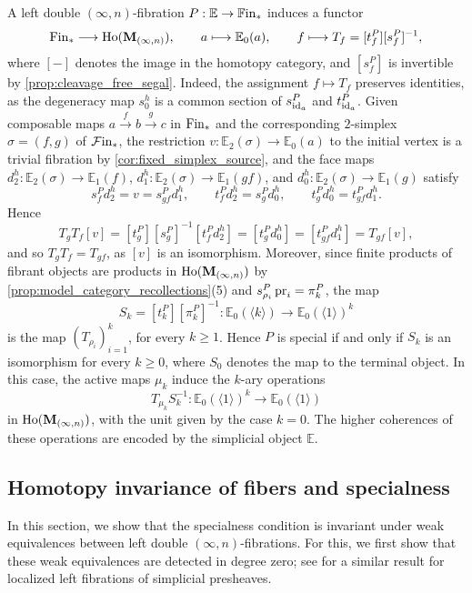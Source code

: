 \documentclass[10pt,reqno]{amsart}
\begin{document}
\begin{rmk}
\label{rem:internal_transport_operations}
A left double $(\infty,n)$-fibration $P:\mathbb E\to\mathbb{F}\mathrm{in}_*$
induces a functor
\[
\mathrm{Fin}_*\longrightarrow\operatorname{Ho}(\mathbf M_{(\infty,n)}),
\qquad
a\longmapsto\mathbb E_0(a),
\qquad
f\longmapsto T_f=[t_f^P][s_f^P]^{-1},
\]
where $[-]$ denotes the image in the homotopy category, and
$[s_f^P]$ is invertible by \cref{prop:cleavage_free_segal}. Indeed,
the assignment $f\mapsto T_f$ preserves identities, as the
degeneracy map $s_0^h$ is a common section of $s_{\operatorname{id}_a}^P$ and
$t_{\operatorname{id}_a}^P$. Given composable maps
$a\xrightarrow{f}b\xrightarrow{g}c$ in $\mathrm{Fin}_*$ and the corresponding
$2$-simplex $\sigma=(f,g)$ of $\mathcal{F}\mathrm{in}_*$, the restriction
$v:\mathbb E_2(\sigma)\to\mathbb E_0(a)$ to the initial vertex is a
trivial fibration by \cref{cor:fixed_simplex_source}, and the face
maps $d_2^h:\mathbb E_2(\sigma)\to\mathbb E_1(f)$,
$d_1^h:\mathbb E_2(\sigma)\to\mathbb E_1(gf)$, and
$d_0^h:\mathbb E_2(\sigma)\to\mathbb E_1(g)$ satisfy
\[
s_f^Pd_2^h=v=s_{gf}^Pd_1^h,
\qquad
t_f^Pd_2^h=s_g^Pd_0^h,
\qquad
t_g^Pd_0^h=t_{gf}^Pd_1^h.
\]
Hence
\[
T_gT_f[v]
=[t_g^P][s_g^P]^{-1}[t_f^Pd_2^h]
=[t_g^Pd_0^h]
=[t_{gf}^Pd_1^h]
=T_{gf}[v],
\]
and so $T_gT_f=T_{gf}$, as $[v]$ is an isomorphism. Moreover,
since finite products of fibrant objects are products in
$\operatorname{Ho}(\mathbf M_{(\infty,n)})$ by \cref{prop:model_category_recollections}(5) and
$s_{\rho_i}^P\operatorname{pr}_i=\pi_k^P$, the map
\[
S_k=[t_k^P][\pi_k^P]^{-1}:
\mathbb E_0(\langle k\rangle)
\longrightarrow\mathbb E_0(\langle1\rangle)^k
\]
is the map $(T_{\rho_i})_{i=1}^k$, for every $k\geq1$. Hence $P$
is special if and only if $S_k$ is an isomorphism for every
$k\geq0$, where $S_0$ denotes the map to the terminal object. In
this case, the active maps $\mu_k$ induce the $k$-ary operations
\[
T_{\mu_k}S_k^{-1}:\mathbb E_0(\langle1\rangle)^k
\longrightarrow\mathbb E_0(\langle1\rangle)
\]
in $\operatorname{Ho}(\mathbf M_{(\infty,n)})$, with the unit given by the case $k=0$. The
higher coherences of these operations are encoded by the simplicial
object $\mathbb E$.
\end{rmk}

\subsection{Homotopy invariance of fibers and specialness}

\label{subsec:general_fiber_comparison}

In this section, we show that the specialness condition is invariant
under weak equivalences between left double $(\infty,n)$-fibrations.
For this, we first show that these weak equivalences are detected in
degree zero; see \cite[Theorem~4.62]{Rasekh2021Yoneda} for a similar
result for localized left fibrations of simplicial presheaves.
\end{document}

